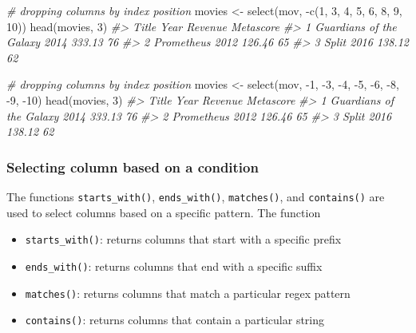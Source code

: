 \documentclass[
]{book}
\newenvironment{Shaded}{\begin{snugshade}}{\end{snugshade}}
\newcommand{\CommentTok}[1]{\textcolor[rgb]{0.56,0.35,0.01}{\textit{#1}}}
\newcommand{\DecValTok}[1]{\textcolor[rgb]{0.00,0.00,0.81}{#1}}
\newcommand{\FunctionTok}[1]{\textcolor[rgb]{0.00,0.00,0.00}{#1}}
\newcommand{\NormalTok}[1]{#1}
\newcommand{\OtherTok}[1]{\textcolor[rgb]{0.56,0.35,0.01}{#1}}
\newcommand{\SpecialCharTok}[1]{\textcolor[rgb]{0.00,0.00,0.00}{#1}}
\providecommand{\tightlist}{%
  \setlength{\itemsep}{0pt}\setlength{\parskip}{0pt}}
\begin{document}
\begin{Shaded}
\begin{Highlighting}[]
\CommentTok{\# dropping columns by index position}
\NormalTok{movies }\OtherTok{\textless{}{-}} \FunctionTok{select}\NormalTok{(mov, }\SpecialCharTok{{-}}\FunctionTok{c}\NormalTok{(}\DecValTok{1}\NormalTok{, }\DecValTok{3}\NormalTok{, }\DecValTok{4}\NormalTok{, }\DecValTok{5}\NormalTok{, }\DecValTok{6}\NormalTok{, }\DecValTok{8}\NormalTok{, }\DecValTok{9}\NormalTok{, }\DecValTok{10}\NormalTok{))}
\FunctionTok{head}\NormalTok{(movies, }\DecValTok{3}\NormalTok{)}
\CommentTok{\#\textgreater{}                     Title Year Revenue Metascore}
\CommentTok{\#\textgreater{} 1 Guardians of the Galaxy 2014  333.13        76}
\CommentTok{\#\textgreater{} 2              Prometheus 2012  126.46        65}
\CommentTok{\#\textgreater{} 3                   Split 2016  138.12        62}

\CommentTok{\# dropping columns by index position}
\NormalTok{movies }\OtherTok{\textless{}{-}} \FunctionTok{select}\NormalTok{(mov, }\SpecialCharTok{{-}}\DecValTok{1}\NormalTok{, }\SpecialCharTok{{-}}\DecValTok{3}\NormalTok{, }\SpecialCharTok{{-}}\DecValTok{4}\NormalTok{, }\SpecialCharTok{{-}}\DecValTok{5}\NormalTok{, }\SpecialCharTok{{-}}\DecValTok{6}\NormalTok{, }\SpecialCharTok{{-}}\DecValTok{8}\NormalTok{, }\SpecialCharTok{{-}}\DecValTok{9}\NormalTok{, }\SpecialCharTok{{-}}\DecValTok{10}\NormalTok{)}
\FunctionTok{head}\NormalTok{(movies, }\DecValTok{3}\NormalTok{)}
\CommentTok{\#\textgreater{}                     Title Year Revenue Metascore}
\CommentTok{\#\textgreater{} 1 Guardians of the Galaxy 2014  333.13        76}
\CommentTok{\#\textgreater{} 2              Prometheus 2012  126.46        65}
\CommentTok{\#\textgreater{} 3                   Split 2016  138.12        62}
\end{Highlighting}
\end{Shaded}

\hypertarget{selecting-column-based-on-a-condition}{%
\subsubsection{Selecting column based on a condition}\label{selecting-column-based-on-a-condition}}

The functions \texttt{starts\_with()}, \texttt{ends\_with()}, \texttt{matches()}, and \texttt{contains()} are used to select columns based on a specific pattern. The function

\begin{itemize}
\tightlist
\item
  \texttt{starts\_with()}: returns columns that start with a specific prefix
\item
  \texttt{ends\_with()}: returns columns that end with a specific suffix
\item
  \texttt{matches()}: returns columns that match a particular regex pattern
\item
  \texttt{contains()}: returns columns that contain a particular string
\end{itemize}
\end{document}

